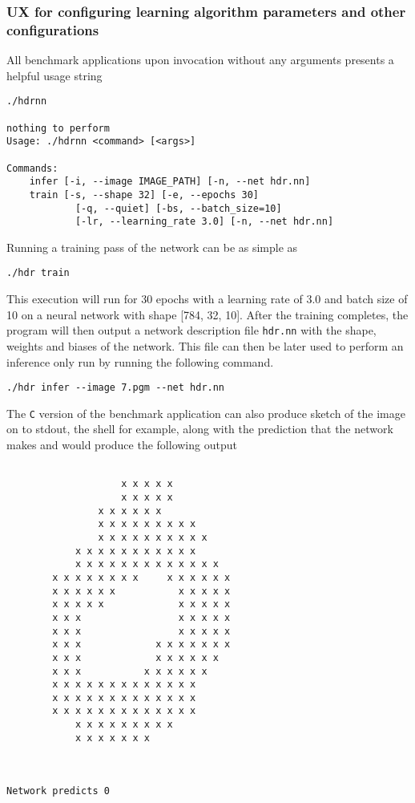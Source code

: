 \subsubsection{UX for configuring learning algorithm parameters and other configurations}
\label{section:hdrnn-ux}

All benchmark applications upon invocation without any arguments presents a helpful usage string

\begin{verbatim}
./hdrnn

nothing to perform
Usage: ./hdrnn <command> [<args>]

Commands:
	infer [-i, --image IMAGE_PATH] [-n, --net hdr.nn]
	train [-s, --shape 32] [-e, --epochs 30]
			[-q, --quiet] [-bs, --batch_size=10]
			[-lr, --learning_rate 3.0] [-n, --net hdr.nn]
\end{verbatim}

Running a training pass of the network can be as simple as

\begin{verbatim}
./hdr train
\end{verbatim}

This execution will run for 30 epochs with a learning rate of 3.0 and batch size of 10 on a neural network with shape [784, 32, 10]. After the training completes, the program will then output a network description file \texttt{hdr.nn} with the shape, weights and biases of the network. This file can then be later used to perform an inference only run by running the following command.

\begin{verbatim}
./hdr infer --image 7.pgm --net hdr.nn
\end{verbatim}

The \texttt{C} version of the benchmark application can also produce sketch of the image on to stdout, the shell for example, along with the prediction that the network makes and would produce the following output

\begin{verbatim}

					x x x x x
					x x x x x
				x x x x x x
				x x x x x x x x x
				x x x x x x x x x x
			x x x x x x x x x x x
			x x x x x x x x x x x x x
		x x x x x x x x     x x x x x x
		x x x x x x           x x x x x
		x x x x x             x x x x x
		x x x                 x x x x x
		x x x                 x x x x x
		x x x             x x x x x x x
		x x x             x x x x x x
		x x x           x x x x x x
		x x x x x x x x x x x x x
		x x x x x x x x x x x x x
		x x x x x x x x x x x x x
			x x x x x x x x x
			x x x x x x x



Network predicts 0
\end{verbatim}

